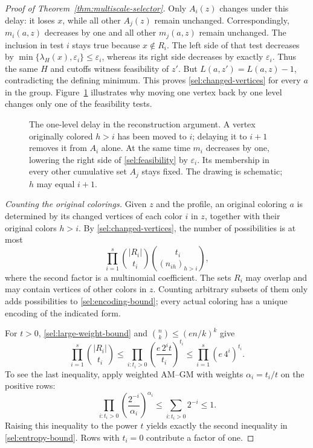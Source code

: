\begin{proof}[Proof of Theorem~\ref{thm:multiscale-selector}]
Only $A_i(z)$ changes under this delay: it loses $x$, while all
other $A_j(z)$ remain unchanged.  Correspondingly, $m_i(a,z)$
decreases by one and all other $m_j(a,z)$ remain unchanged.
The inclusion in test $i$ stays true because $x\notin R_i$.
The left side of that test decreases by
$\min\{\lambda_H(x),\varepsilon_i\}\le\varepsilon_i$, whereas its
right side decreases by exactly $\varepsilon_i$.
Thus the same $H$ and cutoffs witness feasibility of $z'$.
But $L(a,z')=L(a,z)-1$, contradicting the defining minimum.
This proves \eqref{sel:changed-vertices} for every $a$ in the group.
Figure~\ref{fig:one-level-delay} illustrates why moving one vertex back
by one level changes only one of the feasibility tests.

\begin{figure}[ht]
\centering

\caption{The one-level delay in the reconstruction argument. A vertex
originally colored $h>i$ has been moved to $i$; delaying it to $i+1$
removes it from $A_i$ alone. At the same time $m_i$ decreases by one,
lowering the right side of \eqref{sel:feasibility} by $\varepsilon_i$.
Its membership in every other cumulative set $A_j$ stays fixed.
The drawing is schematic; $h$ may equal $i+1$.}
\label{fig:one-level-delay}
\end{figure}

\medskip
\noindent\textit{Counting the original colorings.}
Given $z$ and the profile, an original coloring $a$ is determined by
its changed vertices of each color $i$ in $z$, together with their
original colors $h>i$.  By \eqref{sel:changed-vertices}, the number
of possibilities is at most
\begin{equation}
\label{sel:encoding-bound}
  \prod_{i=1}^s
    \binom{|R_i|}{t_i}
    \binom{t_i}{(n_{ih})_{h>i}},
\end{equation}
where the second factor is a multinomial coefficient.
The sets $R_i$ may overlap and may contain vertices of other colors
in $z$.  Counting arbitrary subsets of them only adds possibilities
to \eqref{sel:encoding-bound}; every actual coloring has a unique
encoding of the indicated form.

For $t>0$, \eqref{sel:large-weight-bound} and
$\binom{n}{k}\le(en/k)^k$ give
\begin{equation}
\label{sel:entropy-bound}
  \prod_{i=1}^s\binom{|R_i|}{t_i}
  \le
  \prod_{i:t_i>0}\left(\frac{e\,2^i t}{t_i}\right)^{t_i}
  \le \prod_{i=1}^s(e\,4^i)^{t_i}.
\end{equation}
To see the last inequality, apply weighted AM--GM with weights
$\alpha_i=t_i/t$ on the positive rows:
\[
  \prod_{i:t_i>0}
     \left(\frac{2^{-i}}{\alpha_i}\right)^{\alpha_i}
  \le \sum_{i:t_i>0}2^{-i}\le1.
\]
Raising this inequality to the power $t$ yields exactly the second
inequality in \eqref{sel:entropy-bound}.  Rows with $t_i=0$
contribute a factor of one.


\end{proof}
